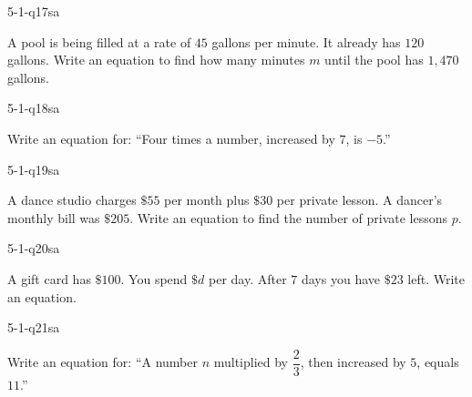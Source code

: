\begin{practiceQuestion}{5-1-q17}{sa}
\begin{questionText}
A pool is being filled at a rate of $45$ gallons per minute. It already has $120$ gallons. Write an equation to find how many minutes $m$ until the pool has $1{,}470$ gallons.
\end{questionText}
\end{practiceQuestion}

\begin{practiceQuestion}{5-1-q18}{sa}
\begin{questionText}
Write an equation for: ``Four times a number, increased by $7$, is $-5$.''
\end{questionText}
\end{practiceQuestion}

\begin{practiceQuestion}{5-1-q19}{sa}
\begin{questionText}
A dance studio charges $\$55$ per month plus $\$30$ per private lesson. A dancer's monthly bill was $\$205$. Write an equation to find the number of private lessons $p$.
\end{questionText}
\end{practiceQuestion}

\begin{practiceQuestion}{5-1-q20}{sa}
\begin{questionText}
A gift card has $\$100$. You spend $\$d$ per day. After $7$ days you have $\$23$ left. Write an equation.
\end{questionText}
\end{practiceQuestion}

\begin{practiceQuestion}{5-1-q21}{sa}
\begin{questionText}
Write an equation for: ``A number $n$ multiplied by $\dfrac{2}{3}$, then increased by $5$, equals $11$.''
\end{questionText}
\end{practiceQuestion}

